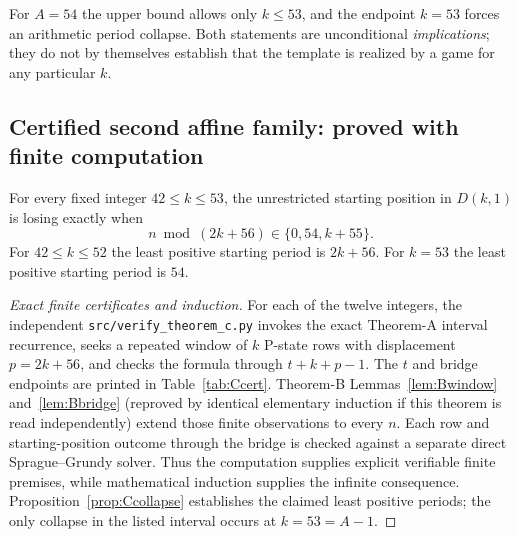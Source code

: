 For $A=54$ the upper bound allows only $k\le53$, and the endpoint $k=53$ forces an arithmetic period collapse. Both statements are unconditional \emph{implications}; they do not by themselves establish that the template is realized by a game for any particular $k$.

\subsection{Certified second affine family: proved with finite computation}
\begin{theorem}\label{thm:Cfinite}
For every fixed integer $42\le k\le53$, the unrestricted starting position in $D(k,1)$ is losing exactly when
\[\boxed{n\bmod(2k+56)\in\{0,54,k+55\}.}\]
For $42\le k\le52$ the least positive starting period is $2k+56$. For $k=53$ the least positive starting period is $54$.
\end{theorem}
\begin{proof}[Exact finite certificates and induction]
For each of the twelve integers, the independent \texttt{src/verify\_theorem\_c.py} invokes the exact Theorem-A interval recurrence, seeks a repeated window of $k$ P-state rows with displacement $p=2k+56$, and checks the formula through $t+k+p-1$. The $t$ and bridge endpoints are printed in Table~\ref{tab:Ccert}. Theorem-B Lemmas~\ref{lem:Bwindow} and~\ref{lem:Bbridge} (reproved by identical elementary induction if this theorem is read independently) extend those finite observations to every $n$. Each row and starting-position outcome through the bridge is checked against a separate direct Sprague--Grundy solver. Thus the computation supplies explicit verifiable finite premises, while mathematical induction supplies the infinite consequence. Proposition~\ref{prop:Ccollapse} establishes the claimed least positive periods; the only collapse in the listed interval occurs at $k=53=A-1$.
\end{proof}
